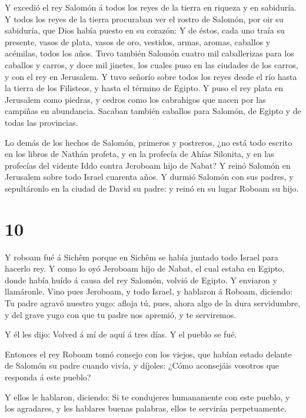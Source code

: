  Y excedió el rey Salomón á todos los reyes de la tierra en
riqueza y en sabiduría.  Y todos los reyes de la tierra
procuraban ver el rostro de Salomón, por oir su sabiduría, que Dios
había puesto en su corazón:  Y de éstos, cada uno traía su
presente, vasos de plata, vasos de oro, vestidos, armas, aromas,
caballos y acémilas, todos los años.  Tuvo también Salomón
cuatro mil caballerizas para los caballos y carros, y doce mil jinetes,
los cuales puso en las ciudades de los carros, y con el rey en
Jerusalem.  Y tuvo señorío sobre todos los reyes desde el
río hasta la tierra de los Filisteos, y hasta el término de Egipto.
 Y puso el rey plata en Jerusalem como piedras, y cedros
como los cabrahigos que nacen por las campiñas en abundancia.
 Sacaban también caballos para Salomón, de Egipto y de
todas las provincias.

 Lo demás de los hechos de Salomón, primeros y postreros,
¿no está todo escrito en los libros de Nathán profeta, y en la profecía
de Ahías Silonita, y en las profecías del vidente Iddo contra Jeroboam
hijo de Nabat?  Y reinó Salomón en Jerusalem sobre todo
Israel cuarenta años.  Y durmió Salomón con sus padres, y
sepultáronlo en la ciudad de David su padre: y reinó en su lugar Roboam
su hijo.

\hypertarget{section-9}{%
\section{10}\label{section-9}}

 Y roboam fué á Sichêm porque en Sichêm se había juntado
todo Israel para hacerlo rey.  Y como lo oyó Jeroboam hijo
de Nabat, el cual estaba en Egipto, donde había huído á causa del rey
Salomón, volvió de Egipto.  Y enviaron y llamáronle. Vino
pues Jeroboam, y todo Israel, y hablaron á Roboam, diciendo:
 Tu padre agravó nuestro yugo: afloja tú, pues, ahora algo
de la dura servidumbre, y del grave yugo con que tu padre nos apremió, y
te serviremos.

 Y él les dijo: Volved á mí de aquí á tres días. Y el pueblo
se fué.

 Entonces el rey Roboam tomó consejo con los viejos, que
habían estado delante de Salomón su padre cuando vivía, y díjoles: ¿Cómo
aconsejáis vosotros que responda á este pueblo?

 Y ellos le hablaron, diciendo: Si te condujeres humanamente
con este pueblo, y los agradares, y les hablares buenas palabras, ellos
te servirán perpetuamente.

